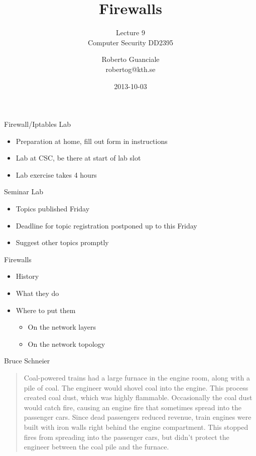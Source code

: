\documentclass{beamer}
\title{Firewalls}
\subtitle{Lecture 9 \\ Computer Security DD2395}
\author[R. Guanciale]{
  Roberto Guanciale\\
  robertog@kth.se
}
\date{2013-10-03}
\begin{document}
\begin{frame}[plain]
  \titlepage
\end{frame}

\begin{frame}{Firewall/Iptables Lab}
  \begin{itemize}
  \item Preparation at home, fill out form in instructions 
  \item Lab at CSC, be there at start of lab slot 
  \item Lab exercise takes 4 hours
  \end{itemize}
\end{frame}

\begin{frame}{Seminar Lab}
  \begin{itemize}
  \item Topics published Friday
  \item Deadline for topic registration postponed up to this Friday
  \item Suggest other topics promptly
  \end{itemize}
\end{frame}

\begin{frame}{Firewalls}
  \begin{itemize}
  \item History 
  \item What they do 
  \item Where to put them 
    \begin{itemize}
    \item On the network layers 
    \item On the network topology
    \end{itemize}
  \end{itemize}
\end{frame}

\begin{frame}{Bruce Schneier}
  
  \begin{quote}
Coal-powered trains had a large furnace in the 
engine room, along with a pile of coal. The 
engineer would shovel coal into the engine. 
This process created coal dust, which was 
highly flammable. Occasionally the coal dust 
would catch fire, causing an engine fire that 
sometimes spread into the passenger cars. 
Since dead passengers reduced revenue, train 
engines were built with iron walls right behind 
the engine compartment. This stopped fires 
from spreading into the passenger cars, but 
didn't protect the engineer between the coal pile 
and the furnace.
  \end{quote}
\end{frame}
\end{document}
